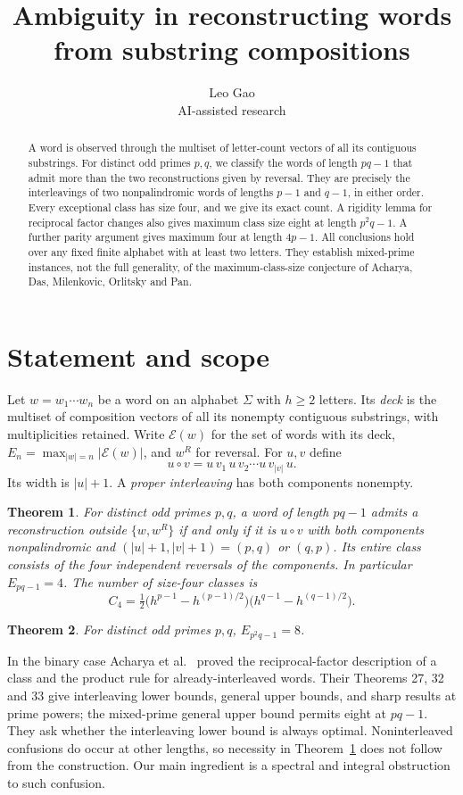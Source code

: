\documentclass[11pt]{article}
\title{Ambiguity in reconstructing words\\ from substring compositions}
\author{Leo Gao\\[-2pt]\small AI-assisted research}
\date{}
\newtheorem{theorem}{Theorem}
\newcommand{\E}{\mathcal E}
\begin{document}
\maketitle
\begin{abstract}
A word is observed through the multiset of letter-count vectors of all its contiguous substrings. For distinct odd primes \(p,q\), we classify the words of length \(pq-1\) that admit more than the two reconstructions given by reversal. They are precisely the interleavings of two nonpalindromic words of lengths \(p-1\) and \(q-1\), in either order. Every exceptional class has size four, and we give its exact count. A rigidity lemma for reciprocal factor changes also gives maximum class size eight at length \(p^2q-1\). A further parity argument gives maximum four at length \(4p-1\). All conclusions hold over any fixed finite alphabet with at least two letters. They establish mixed-prime instances, not the full generality, of the maximum-class-size conjecture of Acharya, Das, Milenkovic, Orlitsky and Pan.
\end{abstract}

\section{Statement and scope}
Let \(w=w_1\cdots w_n\) be a word on an alphabet \(\Sigma\) with \(h\ge2\) letters. Its \emph{deck} is the multiset of composition vectors of all its nonempty contiguous substrings, with multiplicities retained. Write \(\E(w)\) for the set of words with its deck, \(E_n=\max_{|w|=n}|\E(w)|\), and \(w^R\) for reversal. For \(u,v\) define
\[
 u\circ v=u\,v_1\,u\,v_2\cdots u\,v_{|v|}\,u.
\]
Its width is \(|u|+1\). A \emph{proper interleaving} has both components nonempty.
\begin{theorem}\label{main}
For distinct odd primes \(p,q\), a word of length \(pq-1\) admits a reconstruction outside \(\{w,w^R\}\) if and only if it is \(u\circ v\) with both components nonpalindromic and \((|u|+1,|v|+1)=(p,q)\) or \((q,p)\). Its entire class consists of the four independent reversals of the components. In particular \(E_{pq-1}=4\). The number of size-four classes is
\[
 C_4=\tfrac12\big(h^{p-1}-h^{(p-1)/2}\big)
                   \big(h^{q-1}-h^{(q-1)/2}\big).
\]
\end{theorem}
\begin{theorem}\label{repeat}
For distinct odd primes \(p,q\), \(E_{p^2q-1}=8\).
\end{theorem}

In the binary case Acharya et al.\ \cite{admop} proved the reciprocal-factor description of a class and the product rule for already-interleaved words. Their Theorems 27, 32 and 33 give interleaving lower bounds, general upper bounds, and sharp results at prime powers; the mixed-prime general upper bound permits eight at \(pq-1\). They ask whether the interleaving lower bound is always optimal. Noninterleaved confusions do occur at other lengths, so necessity in Theorem~\ref{main} does not follow from the construction. Our main ingredient is a spectral and integral obstruction to such confusion.
\end{document}

